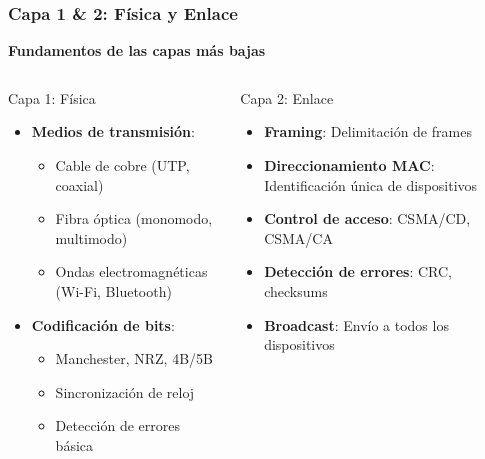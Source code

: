 \documentclass[aspectratio=169]{beamer}
\begin{document}
      \begin{frame}
      \frametitle{Capa 1 \& 2: Física y Enlace}
      
      \begin{center}
      \Large \textbf{Fundamentos de las capas más bajas}
      \end{center}
      
      \begin{columns}
      \begin{block}{Capa 1: Física}
      \begin{itemize}
      \item \textbf{Medios de transmisión}:
        \begin{itemize}
        \item Cable de cobre (UTP, coaxial)
        \item Fibra óptica (monomodo, multimodo)
        \item Ondas electromagnéticas (Wi-Fi, Bluetooth)
        \end{itemize}
      \item \textbf{Codificación de bits}:
        \begin{itemize}
        \item Manchester, NRZ, 4B/5B
        \item Sincronización de reloj
        \item Detección de errores básica
        \end{itemize}
      \end{itemize}
      \end{block}
      
      \begin{block}{Capa 2: Enlace}
      \begin{itemize}
      \item \textbf{Framing}: Delimitación de frames
      \item \textbf{Direccionamiento MAC}: Identificación única de dispositivos
      \item \textbf{Control de acceso}: CSMA/CD, CSMA/CA
      \item \textbf{Detección de errores}: CRC, checksums
      \item \textbf{Broadcast}: Envío a todos los dispositivos
      \end{itemize}
      \end{block}
      \end{columns}
      
      \end{frame}
\end{document}

